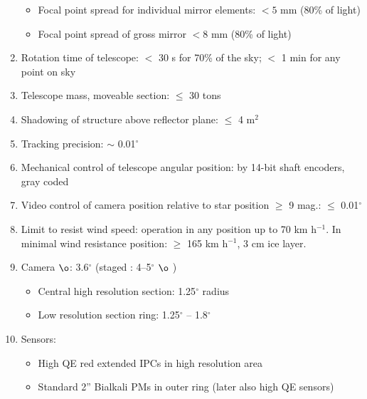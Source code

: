 \begin{enumerate}
\begin{itemize}
\item  Focal point spread for individual mirror elements: $<5$ mm (80\% of
light)

\item  Focal point spread of gross mirror $<8$ mm (80\% of light)
\end{itemize}

\item  Rotation time of telescope: $<$ 30 s for 70\% of the sky; $<$ 1 min
for any point on sky

\item  Telescope mass, moveable section: $\leq $ 30 tons

\item  Shadowing of structure above reflector plane: $\leq $ 4 m$^{2}$

\item  Tracking precision: $\sim $ 0.01$^{\circ }$

\item  Mechanical control of telescope angular position: by 14-bit shaft
encoders, gray coded

\item  Video control of camera position relative to star position $\geq $ 9
mag.: $\leq $ 0.01$^{\circ }$

\item  Limit to resist wind speed: operation in any position up to 70 km h$%
^{-1}$.\newline
In minimal wind resistance position: $\geq $ 165 km h$^{-1}$, 3 cm ice layer.

\item  Camera $\o $: 3.6$^{\circ }$ (staged : 4--5$^{\circ }$ $\o $%
)

\begin{itemize}
\item  Central high resolution section: 1.25$^{\circ }$ radius

\item  Low resolution section ring: 1.25$^{\circ }$ -- 1.8$^{\circ }$
\end{itemize}

\item  Sensors:

\begin{itemize}
\item  High QE red extended IPCs in high resolution area

\item  Standard 2'' Bialkali PMs in outer ring (later also high QE sensors)
\end{itemize}


\end{enumerate}
